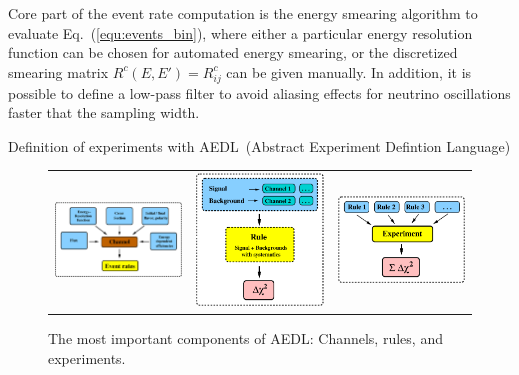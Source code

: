 \documentclass[12pt,a4paper]{article}
\makeatletter
\renewcommand{\section}{\@startsection{section}{1}{0em}{-\baselineskip}%
{\baselineskip}{\normalfont\large\bfseries}}
\newcommand{\eq}{Eq.}
\newcommand{\AEDL}{{\sf AEDL}}
\newcommand{\equ}[1]{\eq~(\ref{equ:#1})}
\makeatother
\begin{document}
Core part of the event rate computation is the energy smearing algorithm
to evaluate \equ{events_bin}, where either a particular energy resolution
 function can be chosen for automated energy smearing, or the discretized
smearing matrix $R^c(E,E') = R^c_{ij} $ can be given manually. In addition, it is possible
to define a low-pass filter to avoid aliasing effects for neutrino
oscillations faster that the sampling width.

\section{Definition of experiments with \AEDL\ (Abstract Experiment 
Defintion Language)}

\begin{figure}[t]
\begin{center}
\begin{tabular}{p{5cm}p{5cm}p{5cm}}
\includegraphics[width=5cm]{AEDL1} &
\includegraphics[width=5cm]{SignalBackground} &
\includegraphics[width=5cm]{Rules} \\
\end{tabular}
\end{center}
\caption{\label{fig:aedl} The most important components of \AEDL :
Channels, rules, and experiments.}
\end{figure}
\end{document}
